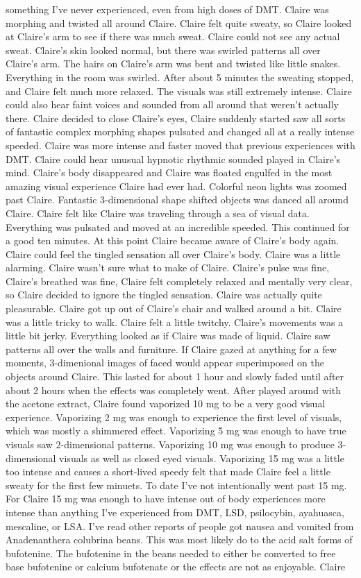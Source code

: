 \documentclass[12pt]{book}
\begin{document}
something I've never experienced, even from high doses of DMT. Claire was morphing and twisted all around Claire. Claire felt quite sweaty, so Claire looked at Claire's arm to see if there was much sweat. Claire could not see any actual sweat. Claire's skin looked normal, but there was swirled patterns all over Claire's arm. The hairs on Claire's arm was bent and twisted like little snakes. Everything in the room was swirled. After about 5 minutes the sweating stopped, and Claire felt much more relaxed. The visuals was still extremely intense. Claire could also hear faint voices and sounded from all around that weren't actually there. Claire decided to close Claire's eyes, Claire suddenly started saw all sorts of fantastic complex morphing shapes pulsated and changed all at a really intense speeded. Claire was more intense and faster moved that previous experiences with DMT. Claire could hear unusual hypnotic rhythmic sounded played in Claire's mind. Claire's body disappeared and Claire was floated engulfed in the most amazing visual experience Claire had ever had. Colorful neon lights was zoomed past Claire. Fantastic 3-dimensional shape shifted objects was danced all around Claire. Claire felt like Claire was traveling through a sea of visual data. Everything was pulsated and moved at an incredible speeded. This continued for a good ten minutes. At this point Claire became aware of Claire's body again. Claire could feel the tingled sensation all over Claire's body. Claire was a little alarming. Claire wasn't sure what to make of Claire. Claire's pulse was fine, Claire's breathed was fine, Claire felt completely relaxed and mentally very clear, so Claire decided to ignore the tingled sensation. Claire was actually quite pleasurable. Claire got up out of Claire's chair and walked around a bit. Claire was a little tricky to walk. Claire felt a little twitchy. Claire's movements was a little bit jerky. Everything looked as if Claire was made of liquid. Claire saw patterns all over the walls and furniture. If Claire gazed at anything for a few moments, 3-dimenional images of faced would appear superimposed on the objects around Claire. This lasted for about 1 hour and slowly faded until after about 2 hours when the effects was completely went. After played around with the acetone extract, Claire found vaporized 10 mg to be a very good visual experience. Vaporizing 2 mg was enough to experience the first level of visuals, which was mostly a shimmered effect. Vaporizing 5 mg was enough to have true visuals saw 2-dimensional patterns. Vaporizing 10 mg was enough to produce 3-dimensional visuals as well as closed eyed visuals. Vaporizing 15 mg was a little too intense and causes a short-lived speedy felt that made Claire feel a little sweaty for the first few minuets. To date I've not intentionally went past 15 mg. For Claire 15 mg was enough to have intense out of body experiences more intense than anything I've experienced from DMT, LSD, psilocybin, ayahuasca, mescaline, or LSA. I've read other reports of people got nausea and vomited from Anadenanthera colubrina beans. This was most likely do to the acid salt forms of bufotenine. The bufotenine in the beans needed to either be converted to free base bufotenine or calcium bufotenate or the effects are not as enjoyable. Claire 
\end{document}
